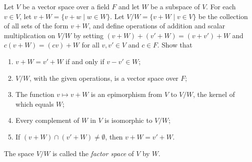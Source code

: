 \begin{problem}[Golan 307]
Let $V$ be a vector space over a field $F$ and let $W$ be a subspace of $V$.  
For each $v \in V$, let $v + W = \{v+w \mid w \in W\}$.  Let 
$V/W = \{v+W \mid v \in V\}$ be the collection of all sets of the form $v+W$,
and define operations of addition and scalar multiplication on $V/W$ by 
setting $(v+W) + (v'+W) = (v+v')+W$ and $c(v+W) = (cv)+W$ for all $v, v' \in V$
and $c\in F$.  Show that
\begin{enumerate}
\item $v+W = v'+W$ if and only if $v-v'\in W$;
\item $V/W$, with the given operations, is a vector space over $F$;
\item The function $v\mapsto v+W$ is an epimorphism from $V$ to $V/W$,
the kernel of which equals $W$;
\item Every complement of $W$ in $V$ is isomorphic to $V/W$;
\item If $(v+W)\cap (v'+W) \neq \emptyset$, then $v+W = v'+W$.
\end{enumerate}
The space $V/W$ is called the \emph{factor space} of $V$ by $W$.
\end{problem}
\smallskip
